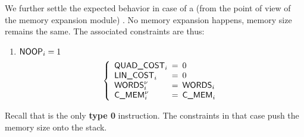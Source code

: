 We further settle the expected behavior in case of a (from the point of view of the memory expansion module) . No memory expansion happens, memory size remains the same. The associated  constraints are thus:
\begin{enumerate}
	\item \If $\textsf{NOOP}_{i} = 1$ \Then
\[
	\left\{
	\begin{array}{lcl}
		\mxpQuadGas_{i} & \!\!\! = \!\!\! & 0 \\
		\mxpLinGas_{i} & \!\!\! = \!\!\! & 0 \\
		\memSize_{i}\new & \!\!\! = \!\!\! & \memSize_{i} \\
		\expCost\new_{i} & \!\!\! = \!\!\! & \expCost_{i} \\
	\end{array}
	\right.
\]
\end{enumerate}
Recall that  is the only \textbf{type 0} instruction. The constraints in that case push the memory size onto the stack.
